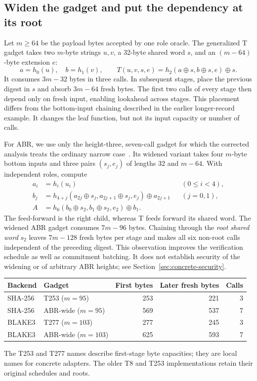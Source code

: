 \documentclass[11pt,letterpaper]{article}
\theoremstyle{definition} %
\begin{document}
\subsection{Widen the gadget and put the dependency at its root}
Let $m\geq64$ be the payload bytes accepted by one role oracle. The
generalized T gadget takes two $m$-byte strings $u,v$, a 32-byte shared
word $s$, and an $(m-64)$-byte extension $e$:
\[
 a=h_0(u),\quad b=h_1(v),\qquad
 T(u,v,s,e)=h_2(a\oplus s,b\oplus s,e)\oplus s.
\]
It consumes $3m-32$ bytes in three calls. In subsequent stages, place the
previous digest in $s$ and absorb $3m-64$ fresh bytes. The first two calls
of every stage then depend only on fresh input, enabling lookahead across
stages. This placement differs from the bottom-input chaining described
in the earlier longer-record example. It changes the leaf function, but
not its input capacity or number of calls.

For ABR, we use only the height-three, seven-call gadget for which the
corrected analysis treats the ordinary narrow case~\cite{DDN22}. Its
widened variant takes four $m$-byte bottom inputs and three pairs
$(s_j,e_j)$ of lengths 32 and $m-64$. With independent roles, compute
\begin{align*}
 a_i&=h_i(u_i) &&(0\leq i<4),\\
 b_j&=h_{4+j}(a_{2j}\oplus s_j,a_{2j+1}\oplus s_j,e_j)
           \oplus a_{2j+1} &&(j=0,1),\\
 A&=h_6(b_0\oplus s_2,b_1\oplus s_2,e_2)\oplus b_1.
\end{align*}
The feed-forward is the right child, whereas T feeds forward its shared
word. The widened ABR gadget consumes $7m-96$ bytes. Chaining through
the \emph{root shared word} $s_2$ leaves $7m-128$ fresh bytes per stage
and makes all six non-root calls independent of the preceding digest.
This observation improves the verification schedule as well as commitment
batching. It does not establish security of the widening or of arbitrary
ABR heights; see Section~\ref{sec:concrete-security}.

\begin{center}
\small
\begin{tabular}{@{}llrrr@{}}
\toprule
Backend & Gadget & First bytes & Later fresh bytes & Calls\\
\midrule
SHA-256 & T253 ($m=95$) & 253 & 221 & 3\\
SHA-256 & ABR-wide ($m=95$) & 569 & 537 & 7\\
BLAKE3 & T277 ($m=103$) & 277 & 245 & 3\\
BLAKE3 & ABR-wide ($m=103$) & 625 & 593 & 7\\
\bottomrule
\end{tabular}
\end{center}
The T253 and T277 names describe first-stage byte capacities; they are
local names for concrete adapters. The older T8 and T253 implementations
retain their original schedules and roots.
\end{document}
